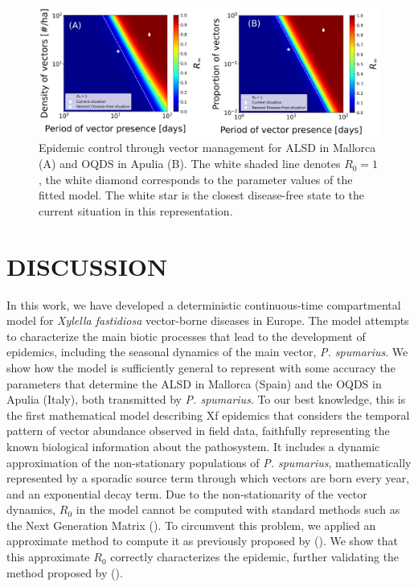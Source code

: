 \begin{figure}[H]
    \centering
    \includegraphics[width=\textwidth]{Figures/Control_strategy.png}
    \caption{Epidemic control through vector management for ALSD in
        Mallorca (A) and OQDS in Apulia (B). The white shaded line denotes
        $R_0=1$, the
        white diamond corresponds to the parameter values of the fitted model.
        The
        white star is the closest disease-free state to the current situation
        in this
        representation.}
    \label{fig:control_strategy}
\end{figure}

\section{DISCUSSION}

In this work, we have developed a deterministic continuous-time
compartmental model for \textit{Xylella fastidiosa} vector-borne diseases in
Europe. The model attempts to characterize the main biotic processes that lead
to the development of epidemics, including the seasonal dynamics of the main
vector, \textit{P. spumarius}. We show how the model is sufficiently general to
represent with some accuracy the parameters that determine the ALSD in Mallorca
(Spain) and the OQDS in Apulia (Italy), both transmitted by \textit{P.
    spumarius}. To our best knowledge, this is the first mathematical model
describing Xf epidemics that considers the temporal pattern of vector abundance
observed in field data, faithfully representing the known biological
information about the pathosystem. It includes a dynamic approximation of the
non-stationary populations of \textit{P. spumarius}, mathematically represented
by a sporadic source term through which vectors are born every year, and an
exponential decay term. Due to the non-stationarity of the vector dynamics,
$R_0$ in the model cannot be computed with standard methods such as the Next
Generation Matrix (\cite{Diekmann2010}). To circumvent this problem, we applied
an approximate method to compute it as previously proposed by
(\cite{GimenezRomero2022_PRE}). We show that this approximate $R_0$ correctly
characterizes the epidemic, further validating the method proposed by
(\cite{GimenezRomero2022_PRE}).

